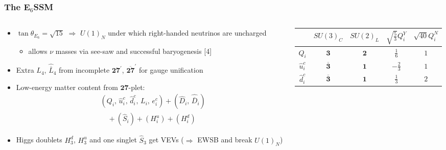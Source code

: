 \documentclass[10pt,aspectratio=169]{beamer}
\begin{document}
\begin{frame}
  \frametitle{The E$_6$SSM}
    \begin{columns}[t]
      \begin{column}{0.5\textwidth}
        \begin{itemize} \itemsep0.2em
        \item $\tan\theta_{E_6} = \sqrt{15}$ $\Rightarrow$ $U(1)_N$
          under which right-handed neutrinos are uncharged
          \begin{itemize}
            \item allows {\color{blue} $\nu$ masses via see-saw} and
              {\color{blue} successful baryogenesis} [4]
          \end{itemize}
        \item Extra $L_4$, $\hat{\overline{L}}_4$ from incomplete
          $\mathbf{27}^\prime$, $\mathbf{\overline{27}}^\prime$ for gauge
          unification
        \item Low-energy matter content from $\mathbf{27}$-plet:
          \begin{align*}
            &(Q_i, \, \hat{u}^c_i, \, \hat{d}^c_i, \, L_i, \,
            e^c_i) + (\hat{D}_i, \, \hat{\overline{D}}_i)\\
            &\quad {} + (\hat{S}_{i}) + (H^u_i) + (H^d_i)
          \end{align*}
        \item Higgs doublets $H^d_3$, $H^u_3$ and one singlet
          $\hat{S}_3$ get VEVs ($\Rightarrow$ EWSB and break $U(1)_N$)
          \vfill
        \end{itemize}
      \end{column}
      \begin{column}{0.5\textwidth}
        \vspace{-40pt}
        \begin{table}[h]
          \centering
          \begin{tabular}{ccccc}
            \toprule
            & $SU(3)_C$ & $SU(2)_L$ & $\sqrt{\frac{5}{3}} Q_i^Y$
            & $\sqrt{40} Q_i^N$ \\
            \midrule
            $Q_i$ & $\mathbf{3}$ & $\mathbf{2}$ & $\frac{1}{6}$ & $1$ \\
            $\hat{u}_i^c$ & $\mathbf{\overline{3}}$ & $\mathbf{1}$
            & $-\frac{2}{3}$ & $1$ \\
            $\hat{d}_i^c$ & $\mathbf{\overline{3}}$ & $\mathbf{1}$
            & $\frac{1}{3}$ & $2$ \\

\end{tabular}
\end{table}
\end{column}
\end{columns}
\end{frame}
\end{document}
